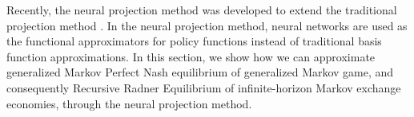 Recently, the neural projection method was developed to extend the traditional projection method \cite{maliar_deep_2021, azinovic2022deep, sauzet_projection_2021}. In the neural projection method, neural networks are used as the functional approximators for policy functions instead of traditional basis function approximations. 
In this section, we show how we can approximate generalized Markov Perfect Nash equilibrium of generalized Markov game, and consequently Recursive Radner Equilibrium of infinite-horizon Markov exchange economies, through the neural projection method.

